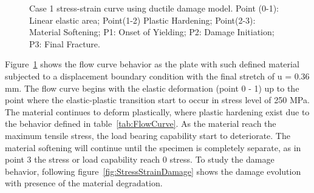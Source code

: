 \documentclass[12pt]{article}
\begin{document}
\begin{figure}[H]
    \caption{Case 1 stress-strain curve using ductile damage model. Point (0-1): Linear elastic area; Point(1-2) Plastic Hardening; Point(2-3): Material Softening; P1: Onset of Yielding; P2: Damage Initiation; P3: Final Fracture.}
    \label{fig:StressStrain}
  \end{figure}

  \hspace{1em}Figure~\ref{fig:StressStrain} shows the flow curve behavior as the plate with such defined material subjected to a displacement boundary condition with the
  final stretch of u = 0.36 mm. The flow curve begins with the elastic deformation (point 0 - 1) up to the point where the elastic-plastic transition start to occur in stress 
  level of 250 MPa. The material continues to deform plastically, where plastic hardening exist due to the behavior defined in table~\ref{tab:FlowCurve}. As the material reach
  the maximum tensile stress, the load bearing capability start to deteriorate. The material softening will continue until the specimen is completely separate, as in point 3
  the stress or load capability reach 0 stress. To study the damage behavior, following figure~\ref{fig:StressStrainDamage} shows the damage evolution with presence of the material
  degradation. 
\end{document}
